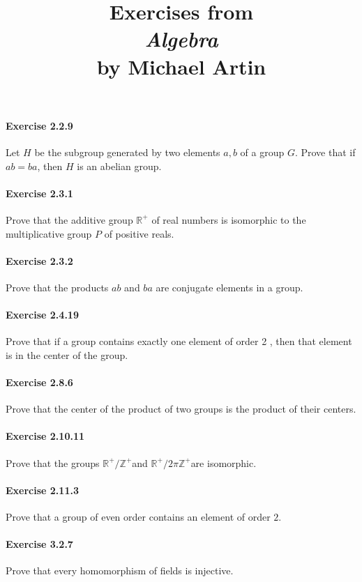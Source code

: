 \documentclass{article}
\title{\textbf{
Exercises from \\
\textit{Algebra} \\
by Michael Artin
}}
\date{}
\begin{document}
\maketitle

\paragraph{Exercise 2.2.9} Let $H$ be the subgroup generated by two elements $a, b$ of a group $G$. Prove that if $a b=b a$, then $H$ is an abelian group.

\paragraph{Exercise 2.3.1} Prove that the additive group $\mathbb{R}^{+}$ of real numbers is isomorphic to the multiplicative group $P$ of positive reals.

\paragraph{Exercise 2.3.2} Prove that the products $a b$ and $b a$ are conjugate elements in a group.

\paragraph{Exercise 2.4.19} Prove that if a group contains exactly one element of order 2 , then that element is in the center of the group.

\paragraph{Exercise 2.8.6} Prove that the center of the product of two groups is the product of their centers.

\paragraph{Exercise 2.10.11} Prove that the groups $\mathbb{R}^{+} / \mathbb{Z}^{+}$and $\mathbb{R}^{+} / 2 \pi \mathbb{Z}^{+}$are isomorphic.

\paragraph{Exercise 2.11.3} Prove that a group of even order contains an element of order $2 .$

\paragraph{Exercise 3.2.7} Prove that every homomorphism of fields is injective. 
\end{document}
